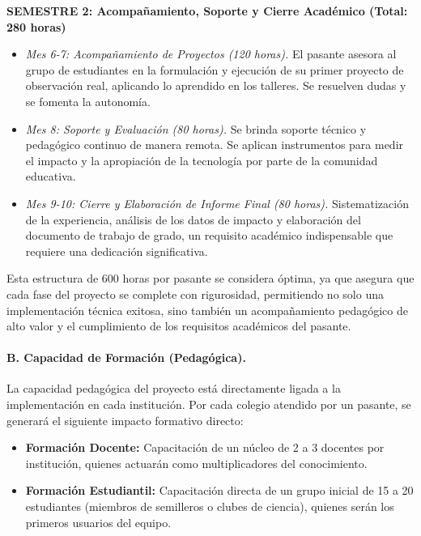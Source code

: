 \textbf{SEMESTRE 2: Acompañamiento, Soporte y Cierre Académico (Total: 280 horas)}
\begin{itemize}
  \item \textit{Mes 6-7: Acompañamiento de Proyectos (120 horas).} El pasante
    asesora al grupo de estudiantes en la formulación y ejecución de su primer
    proyecto de observación real, aplicando lo aprendido en los talleres. Se
    resuelven dudas y se fomenta la autonomía.

  \item \textit{Mes 8: Soporte y Evaluación (80 horas).} Se brinda soporte
    técnico y pedagógico continuo de manera remota. Se aplican instrumentos para
    medir el impacto y la apropiación de la tecnología por parte de la comunidad
    educativa.

  \item \textit{Mes 9-10: Cierre y Elaboración de Informe Final (80 horas).}
    Sistematización de la experiencia, análisis de los datos de impacto y
    elaboración del documento de trabajo de grado, un requisito académico
    indispensable que requiere una dedicación significativa.
\end{itemize}

Esta estructura de 600 horas por pasante se considera óptima, ya que asegura que
cada fase del proyecto se complete con rigurosidad, permitiendo no solo una
implementación técnica exitosa, sino también un acompañamiento pedagógico de
alto valor y el cumplimiento de los requisitos académicos del pasante.

\paragraph{B. Capacidad de Formación (Pedagógica).}
La capacidad pedagógica del proyecto está directamente ligada a la
implementación en cada institución. Por cada colegio atendido por un pasante, se
generará el siguiente impacto formativo directo:
\begin{itemize}
  \item \textbf{Formación Docente:} Capacitación de un núcleo de 2 a 3 docentes
    por institución, quienes actuarán como multiplicadores del conocimiento.

  \item \textbf{Formación Estudiantil:} Capacitación directa de un grupo inicial
    de 15 a 20 estudiantes (miembros de semilleros o clubes de ciencia), quienes
    serán los primeros usuarios del equipo.
\end{itemize}

